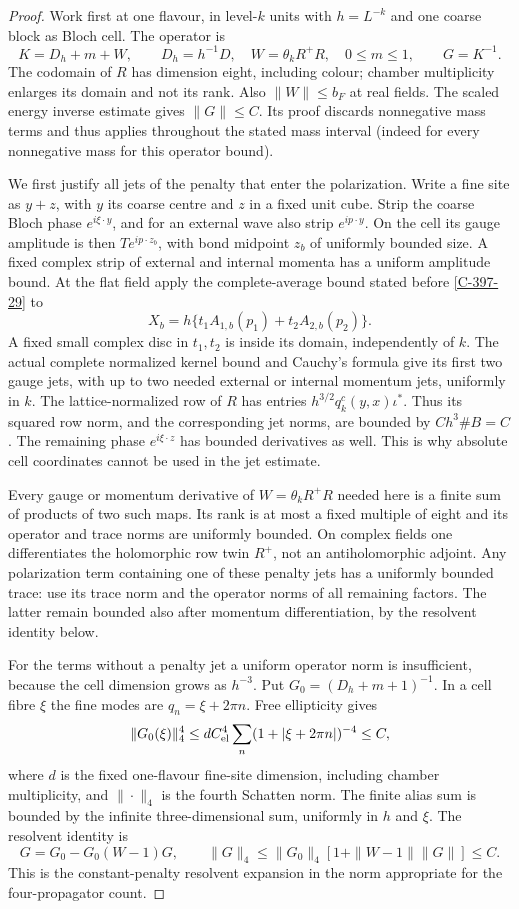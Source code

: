\documentclass[11pt,letterpaper,reqno]{amsart}
\theoremstyle{definition}
\theoremstyle{remark}
\begin{document}
\begin{proof}
Work first at one flavour, in level-$k$ units with
$h=L^{-k}$ and one coarse block as Bloch cell.  The
operator is
\[
 K=D_h+m+W,\qquad D_h=h^{-1}D,
 \quad W=\theta_kR^+R,\quad0\le m\le1,
 \qquad G=K^{-1}.
\]
The codomain of $R$ has dimension eight, including
colour; chamber multiplicity enlarges its domain
and not its rank.  Also $\|W\|\le b_F$ at real
fields.  The scaled energy inverse estimate gives
$\|G\|\le C$.  Its proof discards nonnegative mass
terms and thus applies throughout the stated mass
interval (indeed for every nonnegative mass for
this operator bound).

We first justify all jets of the penalty that enter
the polarization.  Write a fine site as $y+z$, with
$y$ its coarse centre and $z$ in a fixed unit cube.
Strip the coarse Bloch phase $e^{i\xi\cdot y}$,
and for an external wave also strip
$e^{ip\cdot y}$.  On the cell its gauge amplitude
is then $T e^{ip\cdot z_b}$, with bond midpoint
$z_b$ of uniformly bounded size.  A fixed complex
strip of external and internal momenta has a
uniform amplitude bound.  At the flat field apply
the complete-average bound stated before \cref{C-397-29} to
\[
 X_b=h\{t_1A_{1,b}(p_1)+t_2A_{2,b}(p_2)\}.
\]
A fixed small complex disc in $t_1,t_2$ is inside
its domain, independently of $k$.  The actual
complete normalized kernel bound and Cauchy's
formula give its first two gauge jets, with up
to two needed external or internal momentum jets,
uniformly in $k$.  The lattice-normalized row of
$R$ has entries $h^{3/2}q_k^c(y,x)\iota^*$.
Thus its squared row norm, and the corresponding
jet norms, are bounded by $Ch^3\#B=C$.
The remaining phase $e^{i\xi\cdot z}$ has bounded
derivatives as well.  This is why absolute cell
coordinates cannot be used in the jet estimate.

Every gauge or momentum derivative of
$W=\theta_kR^+R$ needed here is a finite sum of
products of two such maps.  Its rank is at most
a fixed multiple of eight and its operator and
trace norms are uniformly bounded.  On complex
fields one differentiates the holomorphic row
twin $R^+$, not an antiholomorphic adjoint.
Any polarization term containing one of these
penalty jets has a uniformly bounded trace:
use its trace norm and the operator norms of
all remaining factors.  The latter remain
bounded also after momentum differentiation,
by the resolvent identity below.

For the terms without a penalty jet a uniform
operator norm is insufficient, because the cell
dimension grows as $h^{-3}$.  Put
$G_0=(D_h+m+1)^{-1}$.  In a cell fibre $\xi$ the
fine modes are $q_n=\xi+2\pi n$.  Free ellipticity
gives
\[
 \|G_0(\xi)\|_4^4
 \le dC_{\rm el}^4\sum_n(1+|\xi+2\pi n|)^{-4}
 \le C,
\]
where $d$ is the fixed one-flavour fine-site
dimension, including chamber multiplicity, and
$\|\cdot\|_4$ is the fourth Schatten norm.
The finite alias sum is bounded by the infinite
three-dimensional sum, uniformly in $h$ and $\xi$.
The resolvent identity is
\[
 G=G_0-G_0(W-1)G,
 \qquad \|G\|_4\le\|G_0\|_4
                     [1+\|W-1\|\|G\|]\le C.
\]
This is the constant-penalty resolvent expansion
in the norm appropriate for the
four-propagator count.


\end{proof}
\end{document}
